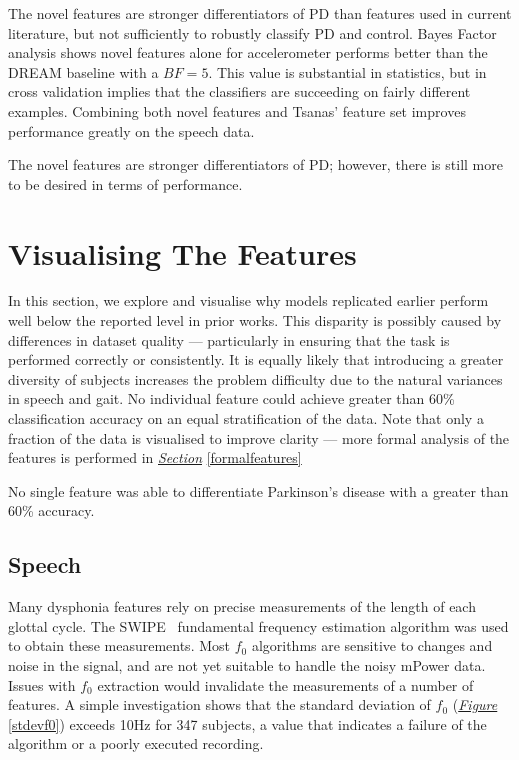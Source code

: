 \documentclass[12pt, twoside]{book}
\begin{document}
The novel features are stronger differentiators of PD than features used in current literature, but not sufficiently to robustly classify PD and control. Bayes Factor analysis shows novel features alone for accelerometer performs better than the DREAM baseline with a $BF=5$. This value is substantial in statistics, but in cross validation implies that the classifiers are succeeding on fairly different examples. Combining both novel features and Tsanas' feature set improves performance greatly on the speech data.

\begin{highlight}
	The novel features are stronger differentiators of PD; however, there is still more to be desired in terms of performance.
\end{highlight}

\vspace{2em}
\section{Visualising The Features}
\label{visfeature}
In this section, we explore and visualise why models replicated earlier perform well below the reported level in prior works. This disparity is possibly caused by differences in dataset quality --- particularly in ensuring that the task is performed correctly or consistently. It is equally likely that introducing a greater diversity of subjects increases the problem difficulty due to the natural variances in speech and gait. No individual feature could achieve greater than 60\% classification accuracy on an equal stratification of the data. Note that only a fraction of the data is visualised to improve clarity --- more formal analysis of the features is performed in \textit{\hyperref[formalfeatures]{Section}} \ref{formalfeatures}

\begin{highlight}
	No single feature was able to differentiate Parkinson's disease with a greater than 60\% accuracy.
\end{highlight}

\subsection{Speech}
Many dysphonia features rely on precise measurements of the length of each glottal cycle. The SWIPE~\cite{camacho2007swipe} fundamental frequency estimation algorithm was used to obtain these measurements. Most $f_0$ algorithms are sensitive to changes and noise in the signal, and are not yet suitable to handle the noisy mPower data. Issues with $f_0$ extraction would invalidate the measurements of a number of features. A simple investigation shows that the standard deviation of $f_0$ (\textit{\hyperref[stdevf0]{Figure}} \ref{stdevf0}) exceeds 10Hz for 347 subjects, a value that indicates a failure of the algorithm or a poorly executed recording.
\end{document}
